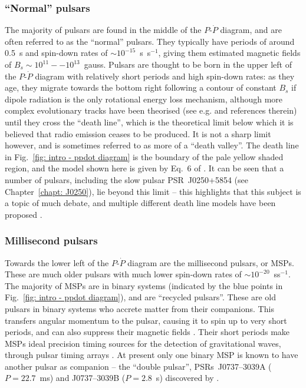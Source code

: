 \subsubsection*{``Normal'' pulsars}
\label{sec: intro - general intro - pulsar population - normal}

The majority of pulsars are found in the middle of the $P$-$\dot{P}$ diagram, and are often referred to as the ``normal'' pulsars. They typically have periods of around 0.5~s and spin-down rates of ${\sim}10^{-15}$~s~s$^{-1}$, giving them estimated magnetic fields of $B_s \sim 10^{11}--10^{13}$~gauss. Pulsars are thought to be born in the upper left of the $P$-$\dot{P}$ diagram with relatively short periods and high spin-down rates: as they age, they migrate towards the bottom right following a contour of constant $B_s$ if dipole radiation is the only rotational energy loss mechanism, although more complex evolutionary tracks have been theorised (see e.g. \citealt{JKxx2017} and references therein) until they cross the ``death line'', which is the theoretical limit below which it is believed that radio emission ceases to be produced. It is not a sharp limit however, and is sometimes referred to as more of a ``death valley''. The death line in Fig.~\ref{fig: intro - ppdot diagram} is the boundary of the pale yellow shaded region, and the model shown here is given by Eq.~6 of \citet{ZHMx2000}. It can be seen that a number of pulsars, including the slow pulsar PSR~J0250+5854 (see Chapter~\ref{chapt: J0250}), lie beyond this limit -- this highlights that this subject is a topic of much debate, and multiple different death line models have been proposed \citep[e.g.][]{CRxx1993,ZHMx2000, FKxx2006, JKxx2017, MBMA2020}.


\subsubsection*{Millisecond pulsars}
\label{sec: intro - general intro - pulsar population - MSPs}

Towards the lower left of the $P$-$\dot{P}$ diagram are the millisecond pulsars, or MSPs. These are much older pulsars with much lower spin-down rates of ${\sim}10^{-20}$~ss$^{-1}$. The majority of MSPs are in binary systems (indicated by the blue points in Fig.~\ref{fig: intro - ppdot diagram}), and are ``recycled pulsars''. These are old pulsars in binary systems who accrete matter from their companions. This transfers angular momentum to the pulsar, causing it to spin up to very short periods, and can also suppress their magnetic fields \citep{BKxx1974, SMSN1989}. Their short periods make MSPs ideal precision timing sources for the detection of gravitational waves, through pulsar timing arrays \citep[e.g][]{FBxx1990,MHB+2013}. At present only one binary MSP is known to have another pulsar as companion -- the ``double pulsar'', PSRs~J0737–3039A ($P=22.7$~ms) and J0737–3039B ($P=2.8$~s) discovered by \citet{BDP+2003}.

